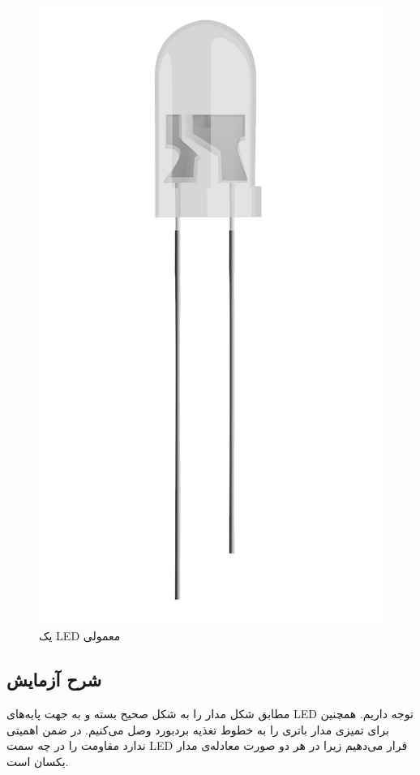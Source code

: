 \begin{figure}[h!]
\centering
\includegraphics[scale=0.15]{introduction/led.png}    
\caption{یک LED معمولی}
\end{figure}

\subsection*{شرح آزمایش}
مطابق شکل مدار را به شکل صحیح بسته و به جهت پایه‌های
LED
توجه داریم.
همچنین برای تمیزی مدار باتری را به خطوط تغذیه بردبورد وصل می‌کنیم.
در ضمن اهمیتی ندارد مقاومت را در چه سمت
LED
قرار می‌دهیم زیرا در هر دو صورت معادله‌ی مدار یکسان است.


